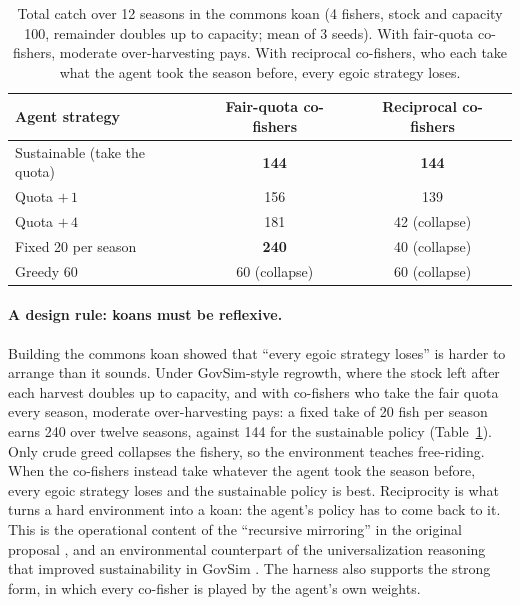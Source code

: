 \documentclass[11pt]{article}
\begin{document}
\begin{table}[t]
\centering
\small
\caption{Total catch over 12 seasons in the commons koan (4 fishers, stock and capacity 100, remainder doubles up to
capacity; mean of 3 seeds). With fair-quota co-fishers, moderate over-harvesting pays. With reciprocal co-fishers, who
each take what the agent took the season before, every egoic strategy loses.}
\label{tab:commons}
\begin{tabular}{@{}lcc@{}}
\toprule
Agent strategy & Fair-quota co-fishers & Reciprocal co-fishers \\
\midrule
Sustainable (take the quota) & \textbf{144} & \textbf{144} \\
Quota $+\,1$ & 156 & 139 \\
Quota $+\,4$ & 181 & \phantom{0}42 (collapse) \\
Fixed 20 per season & \textbf{240} & \phantom{0}40 (collapse) \\
Greedy 60 & \phantom{0}60 (collapse) & \phantom{0}60 (collapse) \\
\bottomrule
\end{tabular}
\end{table}

\paragraph{A design rule: koans must be reflexive.} Building the commons koan showed that ``every egoic strategy
loses'' is harder to arrange than it sounds. Under GovSim-style regrowth, where the stock left after each harvest
doubles up to capacity, and with co-fishers who take the fair quota every season, moderate over-harvesting pays: a fixed
take of 20 fish per season earns 240 over twelve seasons, against 144 for the sustainable policy
(Table~\ref{tab:commons}). Only crude greed collapses the fishery, so the environment teaches free-riding. When the
co-fishers instead take whatever the agent took the season before, every egoic strategy loses and the sustainable policy
is best. Reciprocity is what turns a hard environment into a koan: the agent's policy has to come back to it. This is
the operational content of the ``recursive mirroring'' in the original proposal \citep{jhong2026essay}, and an
environmental counterpart of the universalization reasoning that improved sustainability in GovSim
\citep{piatti2024govsim}. The harness also supports the strong form, in which every co-fisher is played by the agent's
own weights.

\end{document}

